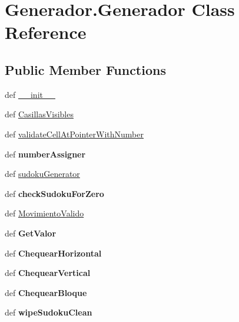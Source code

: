 \hypertarget{class_generador_1_1_generador}{\section{Generador.\-Generador Class Reference}
\label{class_generador_1_1_generador}
}
\subsection*{Public Member Functions}
\begin{DoxyCompactItemize}
\item 
def \hyperlink{class_generador_1_1_generador_a7653a28c2b949a33513e269c80fce22a}{\-\_\-\-\_\-init\-\_\-\-\_\-}
\item 
def \hyperlink{class_generador_1_1_generador_ab5129fee0d088ea23d9fd2a85a73506d}{Casillas\-Visibles}
\item 
def \hyperlink{class_generador_1_1_generador_aef145f37afe0cb9cd9cd6832c0f8ccd9}{validate\-Cell\-At\-Pointer\-With\-Number}
\item 
\hypertarget{class_generador_1_1_generador_ae5ece4fd0d0526f261ee964587f5bd83}{def {\bfseries number\-Assigner}}\label{class_generador_1_1_generador_ae5ece4fd0d0526f261ee964587f5bd83}

\item 
def \hyperlink{class_generador_1_1_generador_af4c2ef52fe2543bdfea778a5a7e6ee7f}{sudoku\-Generator}
\item 
\hypertarget{class_generador_1_1_generador_a96ddfcf197c4b980dacdcad5c52cc5eb}{def {\bfseries check\-Sudoku\-For\-Zero}}\label{class_generador_1_1_generador_a96ddfcf197c4b980dacdcad5c52cc5eb}

\item 
def \hyperlink{class_generador_1_1_generador_afe624fd14668a68697dd8be2c9bddbe1}{Movimiento\-Valido}
\item 
\hypertarget{class_generador_1_1_generador_ab817a51c7982e956a6a1d6e40bae9e60}{def {\bfseries Get\-Valor}}\label{class_generador_1_1_generador_ab817a51c7982e956a6a1d6e40bae9e60}

\item 
\hypertarget{class_generador_1_1_generador_aa143e691cf3301a3ff0a1bc3a56bd172}{def {\bfseries Chequear\-Horizontal}}\label{class_generador_1_1_generador_aa143e691cf3301a3ff0a1bc3a56bd172}

\item 
\hypertarget{class_generador_1_1_generador_af5fa571c200c831435c9614b7369c62b}{def {\bfseries Chequear\-Vertical}}\label{class_generador_1_1_generador_af5fa571c200c831435c9614b7369c62b}

\item 
\hypertarget{class_generador_1_1_generador_aa641c9a08ddfbc84486a0504808fc436}{def {\bfseries Chequear\-Bloque}}\label{class_generador_1_1_generador_aa641c9a08ddfbc84486a0504808fc436}

\item 
\hypertarget{class_generador_1_1_generador_aa935397ae17f757fe5d502b5d81c054e}{def {\bfseries wipe\-Sudoku\-Clean}}\label{class_generador_1_1_generador_aa935397ae17f757fe5d502b5d81c054e}

\end{DoxyCompactItemize}
